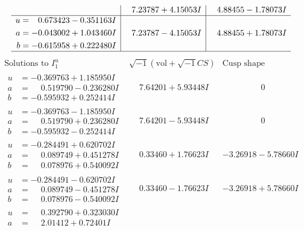 \documentclass[1p]{elsarticle_modified}
\theoremstyle{definition}
\newcommand{\I}{\sqrt{-1}}
\begin{document}
$$\begin{array}{c|c|c}
 & \phantom{-}7.23787 + 4.15053 I & \phantom{-}4.88455 - 1.78073 I \\ \hline\begin{aligned}
u &= \phantom{-}0.673423 - 0.351163 I \\
a &= -0.043002 + 1.043460 I \\
b &= -0.615958 + 0.222480 I\end{aligned}
 & \phantom{-}7.23787 - 4.15053 I & \phantom{-}4.88455 + 1.78073 I\\
 \hline 
 \end{array}$$\newpage$$\begin{array}{c|c|c}  
\text{Solutions to }I^u_{1}& \I (\text{vol} + \sqrt{-1}CS) & \text{Cusp shape}\\
 \hline 
\begin{aligned}
u &= -0.369763 + 1.185950 I \\
a &= \phantom{-}0.519790 - 0.236280 I \\
b &= -0.595932 + 0.252414 I\end{aligned}
 & \phantom{-}7.64201 + 5.93448 I & \phantom{-0.000000 } 0 \\ \hline\begin{aligned}
u &= -0.369763 - 1.185950 I \\
a &= \phantom{-}0.519790 + 0.236280 I \\
b &= -0.595932 - 0.252414 I\end{aligned}
 & \phantom{-}7.64201 - 5.93448 I & \phantom{-0.000000 } 0 \\ \hline\begin{aligned}
u &= -0.284491 + 0.620702 I \\
a &= \phantom{-}0.089749 + 0.451278 I \\
b &= \phantom{-}0.078976 + 0.540092 I\end{aligned}
 & \phantom{-}0.33460 + 1.76623 I & -3.26918 - 5.78660 I \\ \hline\begin{aligned}
u &= -0.284491 - 0.620702 I \\
a &= \phantom{-}0.089749 - 0.451278 I \\
b &= \phantom{-}0.078976 - 0.540092 I\end{aligned}
 & \phantom{-}0.33460 - 1.76623 I & -3.26918 + 5.78660 I \\ \hline\begin{aligned}
u &= \phantom{-}0.392790 + 0.323030 I \\
a &= \phantom{-}2.01412 + 0.72401 I \\

\end{aligned}
\end{array}$$
\end{document}
